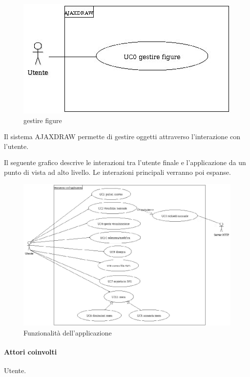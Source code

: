 \begin{figure}[!ht]
\centering
\includegraphics{AJAXDRAW.jpg}
\caption{gestire figure}
\end{figure}

Il sistema AJAXDRAW permette di gestire oggetti attraverso l'interazione con l'utente.

Il seguente grafico descrive le interazioni tra l'utente finale e l'applicazione da un punto di vista ad alto livello. Le interazioni principali verranno poi espanse.
\begin{figure}[!ht]
\centering
\vspace{20pt} 
\includegraphics{UCInterazione.jpg}
\caption{Funzionalit\`a dell'applicazione}
\end{figure}


\paragraph{Attori coinvolti} Utente.
